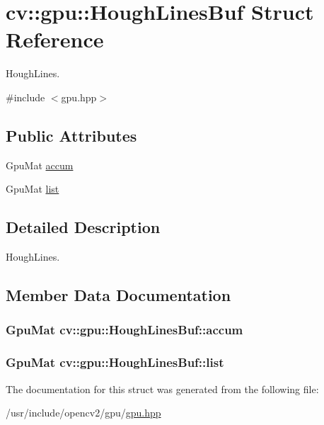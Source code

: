 \hypertarget{structcv_1_1gpu_1_1HoughLinesBuf}{\section{cv\-:\-:gpu\-:\-:Hough\-Lines\-Buf Struct Reference}
\label{structcv_1_1gpu_1_1HoughLinesBuf}
}


Hough\-Lines.  




{\ttfamily \#include $<$gpu.\-hpp$>$}

\subsection*{Public Attributes}
\begin{DoxyCompactItemize}
\item 
Gpu\-Mat \hyperlink{structcv_1_1gpu_1_1HoughLinesBuf_ad804ccd2a956d2fba437dbf3570e7d9a}{accum}
\item 
Gpu\-Mat \hyperlink{structcv_1_1gpu_1_1HoughLinesBuf_a68c3b735dffff258359616608213ddc0}{list}
\end{DoxyCompactItemize}


\subsection{Detailed Description}
Hough\-Lines. 

\subsection{Member Data Documentation}
\hypertarget{structcv_1_1gpu_1_1HoughLinesBuf_ad804ccd2a956d2fba437dbf3570e7d9a}{
\subsubsection[{accum}]{\setlength{\rightskip}{0pt plus 5cm}Gpu\-Mat cv\-::gpu\-::\-Hough\-Lines\-Buf\-::accum}}\label{structcv_1_1gpu_1_1HoughLinesBuf_ad804ccd2a956d2fba437dbf3570e7d9a}
\hypertarget{structcv_1_1gpu_1_1HoughLinesBuf_a68c3b735dffff258359616608213ddc0}{
\subsubsection[{list}]{\setlength{\rightskip}{0pt plus 5cm}Gpu\-Mat cv\-::gpu\-::\-Hough\-Lines\-Buf\-::list}}\label{structcv_1_1gpu_1_1HoughLinesBuf_a68c3b735dffff258359616608213ddc0}


The documentation for this struct was generated from the following file\-:\begin{DoxyCompactItemize}
\item 
/usr/include/opencv2/gpu/\hyperlink{gpu_2gpu_8hpp}{gpu.\-hpp}\end{DoxyCompactItemize}
